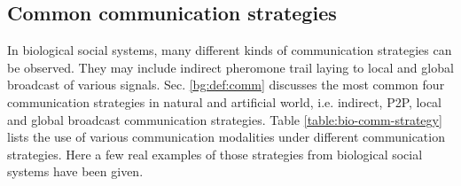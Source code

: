 \subsection{Common communication strategies}
\label{bg:bio-comm:strategies}
In biological social systems, many different kinds of communication strategies can be observed. They may include indirect pheromone trail laying to local and global broadcast of various signals. Sec. \ref{bg:def:comm} discusses the most common four communication strategies in natural and artificial world, i.e. indirect, P2P, local and global broadcast communication strategies. Table \ref{table:bio-comm-strategy} lists the use of various communication modalities under different communication strategies. Here a few real examples of those strategies from biological social systems have been given.

